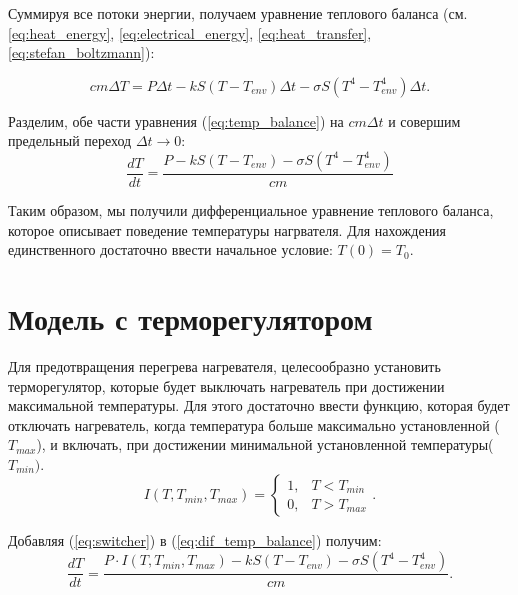Суммируя все потоки энергии, получаем уравнение теплового баланса (см. \ref{eq:heat_energy}, \ref{eq:electrical_energy}, \ref{eq:heat_transfer}, \ref{eq:stefan_boltzmann}):
 
 \begin{equation}
 	cm\Delta T = P\Delta t - k S (T-T_{env})\Delta t - \sigma S (T^4 - T^4_{env})\Delta t .
 	\label{eq:temp_balance}
 \end{equation}
 
 Разделим, обе части уравнения (\ref{eq:temp_balance}) на $cm\Delta t$ и совершим предельный переход $\Delta t \rightarrow 0$:
 \begin{equation}
 	\frac{dT}{dt} = \frac{P - kS(T-T_{env}) - \sigma S (T^4 - T^4_{env})}{cm}
 	\label{eq:dif_temp_balance}
 \end{equation}
 
 Таким образом, мы получили дифференциальное уравнение теплового баланса, которое описывает поведение температуры нагрвателя. 
 Для нахождения единственного достаточно ввести начальное условие: $T(0) = T_0$.
 \section{Модель с терморегулятором}
 
 Для предотвращения перегрева нагревателя, целесообразно установить терморегулятор, которые будет выключать нагреватель при достижении максимальной температуры. 
 Для этого достаточно ввести функцию, которая будет отключать нагреватель, когда температура больше максимально установленной ($T_{max}$), и включать, при достижении минимальной установленной температуры($T_{min})$.
 \begin{equation}
 	I(T, T_{min}, T_{max}) = 
 	\begin{cases}
 		1, & T < T_{min} \\
 		0, & T > T_{max}
 	\end{cases}.
 	\label{eq:switcher}
 \end{equation}
 
 Добавляя (\ref{eq:switcher}) в (\ref{eq:dif_temp_balance}) получим:
  \begin{equation}
 	\frac{dT}{dt} = \frac{P\cdot I(T, T_{min}, T_{max}) - kS(T-T_{env}) - \sigma S (T^4 - T^4_{env})}{cm}
 	\label{eq:dif_temp_balance_with_switcher}.
 \end{equation}
 
 
 
